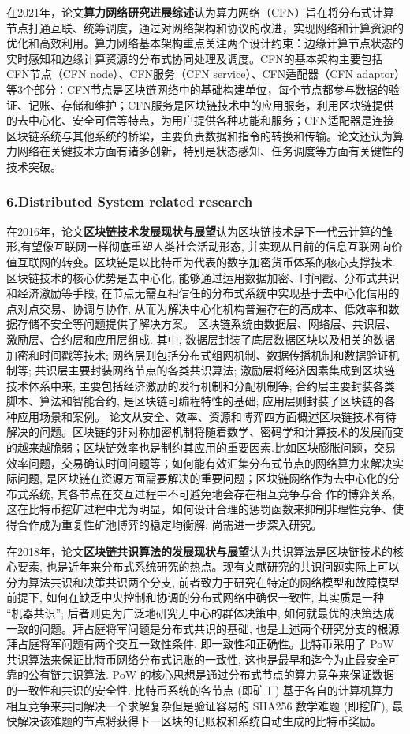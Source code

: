 \documentclass[a4paper,twoside]{scrbook}
\begin{document}
在2021年，论文\textbf{算力网络研究进展综述}认为算力网络（CFN）旨在将分布式计算节点打通互联、统筹调度，通过对网络架构和协议的改进，实现网络和计算资源的优化和高效利用。算力网络基本架构重点关注两个设计约束：边缘计算节点状态的实时感知和边缘计算资源的分布式协同处理及调度。CFN的基本架构主要包括CFN节点（CFN node）、CFN服务（CFN service）、CFN适配器（CFN adaptor）等3个部分：CFN节点是区块链网络中的基础构建单位，每个节点都参与数据的验证、记账、存储和维护；CFN服务是区块链技术中的应用服务，利用区块链提供的去中心化、安全可信等特点，为用户提供各种功能和服务；CFN适配器是连接区块链系统与其他系统的桥梁，主要负责数据和指令的转换和传输。论文还认为算力网络在关键技术方面有诸多创新，特别是状态感知、任务调度等方面有关键性的技术突破。


\subsubsection{6.Distributed System related research}
在2016年，论文\textbf{区块链技术发展现状与展望}认为区块链技术是下一代云计算的雏形,有望像互联网一样彻底重塑人类社会活动形态, 并实现从目前的信息互联网向价值互联网的转变。区块链是以比特币为代表的数字加密货币体系的核心支撑技术. 区块链技术的核心优势是去中心化, 能够通过运用数据加密、时间戳、分布式共识和经济激励等手段, 在节点无需互相信任的分布式系统中实现基于去中心化信用的点对点交易、协调与协作, 从而为解决中心化机构普遍存在的高成本、低效率和数据存储不安全等问题提供了解决方案。
区块链系统由数据层、网络层、共识层、激励层、合约层和应用层组成. 其中, 数据层封装了底层数据区块以及相关的数据加密和时间戳等技术; 网络层则包括分布式组网机制、数据传播机制和数据验证机制等; 共识层主要封装网络节点的各类共识算法; 激励层将经济因素集成到区块链技术体系中来, 主要包括经济激励的发行机制和分配机制等; 合约层主要封装各类脚本、算法和智能合约, 是区块链可编程特性的基础; 应用层则封装了区块链的各种应用场景和案例。
论文从安全、效率、资源和博弈四方面概述区块链技术有待解决的问题。区块链的非对称加密机制将随着数学、密码学和计算技术的发展而变的越来越脆弱；区块链效率也是制约其应用的重要因素.比如区块膨胀问题，交易效率问题，交易确认时间问题等；如何能有效汇集分布式节点的网络算力来解决实际问题, 是区块链在资源方面需要解决的重要问题；区块链网络作为去中心化的分布式系统, 其各节点在交互过程中不可避免地会存在相互竞争与合
作的博弈关系, 这在比特币挖矿过程中尤为明显，如何设计合理的惩罚函数来抑制非理性竞争、使得合作成为重复性矿池博弈的稳定均衡解, 尚需进一步深入研究。

在2018年，论文\textbf{区块链共识算法的发展现状与展望}认为共识算法是区块链技术的核心要素, 也是近年来分布式系统研究的热点。现有文献研究的共识问题实际上可以分为算法共识和决策共识两个分支, 前者致力于研究在特定的网络模型和故障模型前提下, 如何在缺乏中央控制和协调的分布式网络中确保一致性, 其实质是一种 “机器共识”; 后者则更为广泛地研究无中心的群体决策中, 如何就最优的决策达成一致的问题。拜占庭将军问题是分布式共识的基础, 也是上述两个研究分支的根源. 拜占庭将军问题有两个交互一致性条件, 即一致性和正确性。比特币采用了 PoW 共识算法来保证比特币网络分布式记账的一致性, 这也是最早和迄今为止最安全可靠的公有链共识算法. PoW 的核心思想是通过分布式节点的算力竞争来保证数据的一致性和共识的安全性. 比特币系统的各节点 (即矿工) 基于各自的计算机算力相互竞争来共同解决一个求解复杂但是验证容易的 SHA256 数学难题 (即挖矿), 最快解决该难题的节点将获得下一区块的记账权和系统自动生成的比特币奖励。
\end{document}
